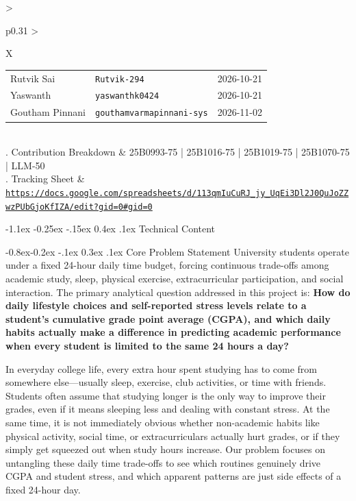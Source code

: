 \documentclass[11pt,a4paper]{article}
\makeatletter
\renewcommand{\arraystretch}{1.04}
\renewcommand\section{\@startsection {section}{1}{\z@}%
                                   {-1.1ex \@plus -0.25ex \@minus -.15ex}%
                                   {0.4ex \@plus.1ex}%
                                   {\normalfont\large\bfseries\color{accent}}}
\renewcommand\subsection{\@startsection{subsection}{2}{\z@}%
                                     {-0.8ex\@plus -0.2ex \@minus -.1ex}%
                                     {0.3ex \@plus .1ex}%
                                     {\normalfont\normalsize\bfseries\color{accent}}}
\makeatother
\begin{document}
\begin{tabularx}{\textwidth}{>{\bfseries\raggedright\arraybackslash}p{} >{\raggedright\arraybackslash}X}
\begin{tabular}[t]{@{}l@{\hspace{3.4em}}l@{\hspace{3.4em}}l@{}}
      Rutvik Sai      & \texttt{Rutvik-294}              & 2026-10-21 \\
      Yaswanth        & \texttt{yaswanthk0424}           & 2026-10-21 \\
      Goutham Pinnani & \texttt{gouthamvarmapinnani-sys} & 2026-11-02 \\
    \end{tabular} \\
. Contribution Breakdown & 25B0993-75 | 25B1016-75 | 25B1019-75 | 25B1070-75 | LLM-50\\
. Tracking Sheet & \href{https://docs.google.com/spreadsheets/d/113qmIuCuRJ_jy_UqEi3Dl2J0QuJoZZwzPUbGjoKfIZA/edit?gid=0#gid=0}{\nolinkurl{https://docs.google.com/spreadsheets/d/113qmIuCuRJ_jy_UqEi3Dl2J0QuJoZZwzPUbGjoKfIZA/edit?gid=0#gid=0}} \\
\end{tabularx}
\renewcommand{\arraystretch}{1.04}
\setlength{\tabcolsep}{6pt}

\newpage
\section{Technical Content}

\subsection{Core Problem Statement}
University students operate under a fixed 24-hour daily time budget, forcing continuous trade-offs among academic study, sleep, physical exercise, extracurricular participation, and social interaction. The primary analytical question addressed in this project is: \textbf{How do daily lifestyle choices and self-reported stress levels relate to a student's cumulative grade point average (CGPA), and which daily habits actually make a difference in predicting academic performance when every student is limited to the same 24 hours a day?}

In everyday college life, every extra hour spent studying has to come from somewhere else---usually sleep, exercise, club activities, or time with friends. Students often assume that studying longer is the only way to improve their grades, even if it means sleeping less and dealing with constant stress. At the same time, it is not immediately obvious whether non-academic habits like physical activity, social time, or extracurriculars actually hurt grades, or if they simply get squeezed out when study hours increase. Our problem focuses on untangling these daily time trade-offs to see which routines genuinely drive CGPA and student stress, and which apparent patterns are just side effects of a fixed 24-hour day.
\end{document}
